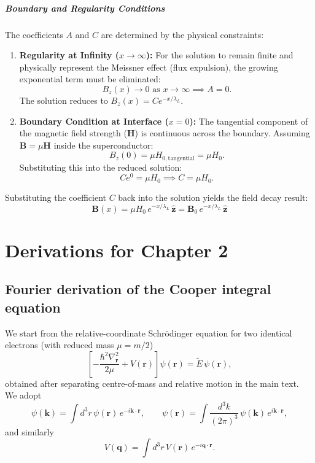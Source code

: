 \paragraph{Boundary and Regularity Conditions}
The coefficients $A$ and $C$ are determined by the physical constraints:
\begin{enumerate}
    \item \textbf{Regularity at Infinity ($x \to \infty$):} For the solution to remain finite and physically represent the Meissner effect (flux expulsion), the growing exponential term must be eliminated:
    $$B_z(x) \to 0 \text{ as } x \to \infty \implies A = 0.$$
    The solution reduces to $B_z(x) = C e^{-x/\lambda_L}$.
    \item \textbf{Boundary Condition at Interface ($x = 0$):} The tangential component of the magnetic field strength ($\mathbf{H}$) is continuous across the boundary. Assuming $\mathbf{B} = \mu\mathbf{H}$ inside the superconductor:
    $$B_z(0) = \mu H_{0, \text{tangential}} = \mu H_0.$$
    Substituting this into the reduced solution:
    $$C e^{0} = \mu H_0 \implies C = \mu H_0.$$
\end{enumerate}

Substituting the coefficient $C$ back into the solution yields the field decay result:
$$\mathbf{B}(x) = \mu H_0\,e^{-x/\lambda_L}\,\hat{\mathbf{z}} = \mathbf{B}_0 \,e^{-x/\lambda_L}\,\hat{\mathbf{z}} $$


\chapter{Derivations for Chapter 2}
\label{app:BCS-derivation}
\section*{Fourier derivation of the Cooper integral equation}
\label{app:cooper_FT}

We start from the relative-coordinate Schr\"odinger equation for two identical electrons
(with reduced mass \(\mu=m/2\))
\begin{equation}
\left[-\frac{\hbar^2\nabla_{\mathbf r}^2}{2\mu}+V(\mathbf r)\right]\psi(\mathbf r)
=\tilde E\,\psi(\mathbf r),
\label{eq:cooper_relative_sch_app}
\end{equation}
obtained after separating centre-of-mass and relative motion in the main text.\\
We adopt
\begin{equation}
\psi(\mathbf{k})=\int d^3 r\, \psi(\mathbf r)\,e^{-i\mathbf k\cdot\mathbf r},
\qquad
\psi(\mathbf r)=\int\!\frac{d^3 k}{(2\pi)^3}\, \psi(\mathbf k)\,e^{i\mathbf k\cdot\mathbf r},
\label{eq:FT_defs_app}
\end{equation}
and similarly
\begin{equation}
    V(\mathbf q)=\int d^3r\,V(\mathbf r)\,e^{-i\mathbf q\cdot\mathbf r}.
    \label{eq:FT_defs_app2}
\end{equation}

